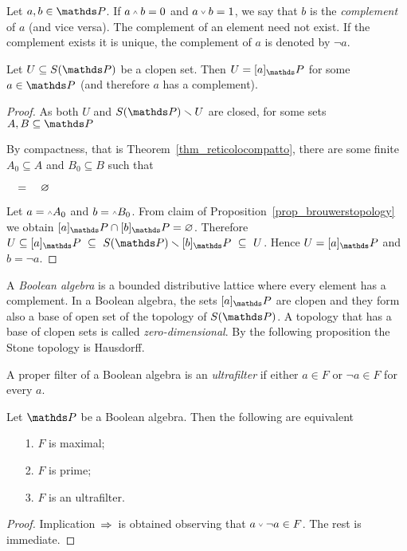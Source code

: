 \documentclass[creche.tex]{subfiles}
\begin{document}
Let $a,b\in\PP$. If $a\swedge  b=0$ and $a\svee b=1$, we say that $b$ is the \emph{complement\/} of $a$ (and vice versa). The complement of an element need not exist. If the complement exists it is unique, the complement of $a$ is denoted by \emph{$\neg a$}.

\begin{lemma}\label{Stone_aperti_chiusi}
Let $U\subseteq S(\PP)$ be a clopen set. Then $U=[a]_\PP$ for some $a\in\PP$ (and therefore $a$ has a complement).
\end{lemma}

\begin{proof}
As both $U$ and $S(\PP)\sm U$ are closed, for some sets $A, B\subseteq\PP$




By compactness, that is Theorem~\ref{thm_reticolocompatto}, there are some finite $A_0\subseteq A$ and $B_0\subseteq B$ such that

$\quad=\quad\varnothing$

Let $a=\swedge A_0$ and $b=\swedge B_0$. From claim  of Proposition~\ref{prop_brouwerstopology} we obtain $[a]_\PP\cap[b]_\PP=\0$. Therefore $U\subseteq [a]_\PP\ \subseteq\ S(\PP)\sm  [b]_\PP\ \subseteq\ U$. Hence $U= [a]_\PP$ and $b=\neg a$.
\end{proof}

A \emph{Boolean algebra\/} is a bounded distributive lattice where every element has a complement. In a Boolean algebra, the sets $[a]_\PP$ are clopen and they form also a base of open set of the topology of $S(\PP)$. A topology that has a base of clopen sets is called \emph{zero-dimensional}. By the following proposition the Stone topology is Hausdorff.

A proper filter of a Boolean algebra is an \emph{ultrafilter\/} if either $a\in F$ or $\neg a\in F$ for every $a$.

\begin{proposition}
Let $\PP$ be a Boolean algebra. Then the following are equivalent
\begin{itemize}
\item[1.] $F$ is maximal;
\item[2.] $F$ is prime;
\item[3.] $F$ is an ultrafilter.
\end{itemize}
\end{proposition}
\begin{proof}
Implication \,$\Rightarrow$\, is obtained observing that $a\svee\neg a\in F$. The rest is immediate.
\end{proof}
\end{document}
